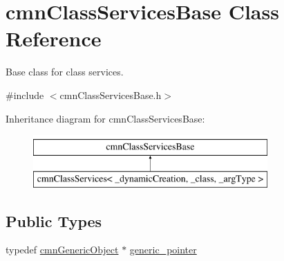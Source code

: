 \hypertarget{classcmn_class_services_base}{\section{cmn\-Class\-Services\-Base Class Reference}
\label{classcmn_class_services_base}
}


Base class for class services.  




{\ttfamily \#include $<$cmn\-Class\-Services\-Base.\-h$>$}

Inheritance diagram for cmn\-Class\-Services\-Base\-:\begin{figure}[H]
\begin{center}
\leavevmode
\includegraphics[height=2.000000cm]{de/dd5/classcmn_class_services_base}
\end{center}
\end{figure}
\subsection*{Public Types}
\begin{DoxyCompactItemize}
\item 
typedef \hyperlink{classcmn_generic_object}{cmn\-Generic\-Object} $\ast$ \hyperlink{classcmn_class_services_base_a859cb10b40a79b083c9ba0cae0d52afd}{generic\-\_\-pointer}
\end{DoxyCompactItemize}
